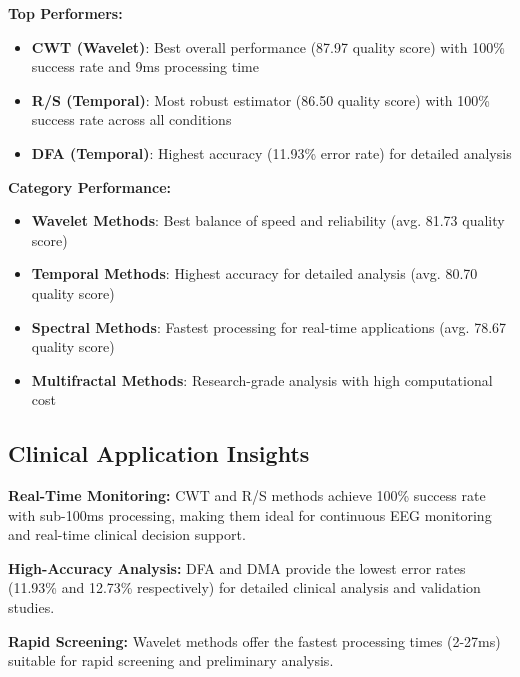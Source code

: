 \textbf{Top Performers:}
\begin{itemize}
    \item \textbf{CWT (Wavelet)}: Best overall performance (87.97 quality score) with 100\% success rate and 9ms processing time
    \item \textbf{R/S (Temporal)}: Most robust estimator (86.50 quality score) with 100\% success rate across all conditions
    \item \textbf{DFA (Temporal)}: Highest accuracy (11.93\% error rate) for detailed analysis
\end{itemize}

\textbf{Category Performance:}
\begin{itemize}
    \item \textbf{Wavelet Methods}: Best balance of speed and reliability (avg. 81.73 quality score)
    \item \textbf{Temporal Methods}: Highest accuracy for detailed analysis (avg. 80.70 quality score)
    \item \textbf{Spectral Methods}: Fastest processing for real-time applications (avg. 78.67 quality score)
    \item \textbf{Multifractal Methods}: Research-grade analysis with high computational cost
\end{itemize}

\subsection{Clinical Application Insights}

\textbf{Real-Time Monitoring:}
CWT and R/S methods achieve 100\% success rate with sub-100ms processing, making them ideal for continuous EEG monitoring and real-time clinical decision support.

\textbf{High-Accuracy Analysis:}
DFA and DMA provide the lowest error rates (11.93\% and 12.73\% respectively) for detailed clinical analysis and validation studies.

\textbf{Rapid Screening:}
Wavelet methods offer the fastest processing times (2-27ms) suitable for rapid screening and preliminary analysis.
